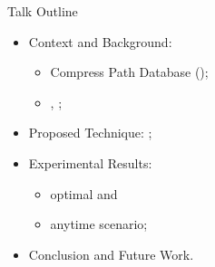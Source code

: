     

\begin{frame}{Talk Outline}
    \begin{itemize}
        \item Context and Background:
        \begin{itemize}
            \item Compress Path Database (\CPD{});
            \item \ALT{}, \AWA{};
        \end{itemize}
        \item Proposed Technique: \CPDSearch{};
        \item Experimental Results: 
            \begin{itemize}
                \item optimal and 
                \item anytime scenario;
            \end{itemize}
        \item Conclusion and Future Work.
    \end{itemize}
\end{frame}